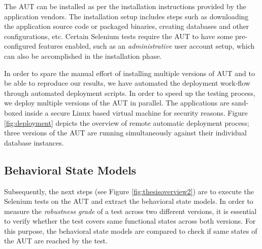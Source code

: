The AUT can be installed as per the installation instructions provided by the application vendors. The installation setup includes steps such as downloading the application source code or packaged binaries, creating databases and other configurations, etc. Certain Selenium tests require the AUT to have some pre-configured features enabled, such as an \textit{administrative} user account setup, which can also be accomplished in the installation phase. 

In order to spare the manual effort of installing multiple versions of AUT and to be able to reproduce our results, we have automated the deployment work-flow through automated deployment scripts. In order to speed up the testing process, we deploy multiple versions of the AUT in parallel.  The applications are sand-boxed inside a secure Linux based virtual machine for security reasons. Figure \ref{fig:deployment} depicts the overview of remote automatic deployment process; three versions of the AUT are running simultaneously against their individual database instances.

\subsection{Behavioral State Models}
\label{stateModelExtraction}
Subsequently, the next steps (see Figure \ref{fig:thesisoverview2}) are to execute the Selenium tests on the AUT and extract the behavioral state models. In order to measure the \textit{robustness grade} of a test across two different versions, it is essential to verify whether the test covers same functional states across both versions. For this purpose, the behavioral state models are compared to check if same states of the AUT are reached by the test. 

